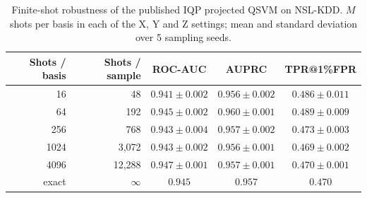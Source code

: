 \begin{table}[t]
\centering
\caption{Finite-shot robustness of the published IQP projected QSVM on NSL-KDD. $M$ shots per basis in
each of the X, Y and Z settings; mean and standard deviation over 5 sampling seeds.}
\label{tab:shots}
\footnotesize
\renewcommand{\arraystretch}{1.15}
\setlength{\tabcolsep}{6pt}
\begin{tabular}{@{}rrccc@{}}
\toprule
\textbf{Shots / basis} & \textbf{Shots / sample} & \textbf{ROC-AUC} & \textbf{AUPRC} & \textbf{TPR@1\%FPR}\\
\midrule
16   & 48     & $0.941\pm0.002$ & $0.956\pm0.002$ & $0.486\pm0.011$\\
64   & 192    & $0.945\pm0.002$ & $0.960\pm0.001$ & $0.489\pm0.009$\\
256  & 768    & $0.943\pm0.004$ & $0.957\pm0.002$ & $0.473\pm0.003$\\
1024 & 3{,}072 & $0.943\pm0.002$ & $0.956\pm0.001$ & $0.469\pm0.002$\\
4096 & 12{,}288 & $0.947\pm0.001$ & $0.957\pm0.001$ & $0.470\pm0.001$\\
\addlinespace[2pt]
exact & $\infty$ & $0.945$ & $0.957$ & $0.470$\\
\bottomrule
\end{tabular}
\end{table}
